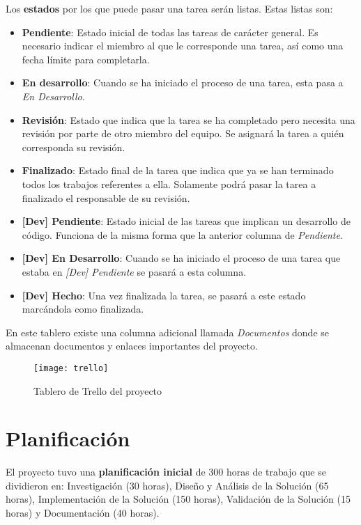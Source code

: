 \documentclass[../main.tex]{subfiles}
\begin{document}
Los \textbf{estados} por los que puede pasar una tarea serán listas. Estas listas son:
\begin{itemize}
    \item\textbf{ Pendiente}: Estado inicial de todas las tareas de carácter general. Es necesario indicar el miembro al que le corresponde una tarea, así como una fecha límite para completarla.
    \item \textbf{En desarrollo}: Cuando se ha iniciado el proceso de una tarea, esta pasa a \textit{En Desarrollo}.
    \item \textbf{Revisión}: Estado que indica que la tarea se ha completado pero necesita una revisión por parte de otro miembro del equipo. Se asignará la tarea a quién corresponda su revisión.
    \item \textbf{Finalizado}: Estado final de la tarea que indica que ya se han terminado todos los trabajos referentes a ella. Solamente podrá pasar la tarea a finalizado el responsable de su revisión.
    \item \textbf{[Dev] Pendiente}: Estado inicial de las tareas que implican un desarrollo de código. Funciona de la misma forma que la anterior columna de \textit{Pendiente}.
    \item \textbf{[Dev] En Desarrollo}: Cuando se ha iniciado el proceso de una tarea que estaba en \textit{[Dev] Pendiente} se pasará a esta columna.
    \item \textbf{[Dev] Hecho}: Una vez finalizada la tarea, se pasará a este estado marcándola como finalizada.
\end{itemize}

En este tablero existe una columna adicional llamada \textit{Documentos} donde se almacenan documentos y enlaces importantes del proyecto.

\begin{figure}[H]
    \centering
    \texttt{[image: trello]}
    \label{img:trello}
    \caption{Tablero de Trello del proyecto}
\end{figure}

\section{Planificación}
El proyecto tuvo una \textbf{planificación inicial} de 300 horas de trabajo que se dividieron en: Investigación (30 horas), Diseño y Análisis de la Solución (65 horas), Implementación de la Solución (150 horas), Validación de la Solución (15 horas) y Documentación (40 horas).
\end{document}
